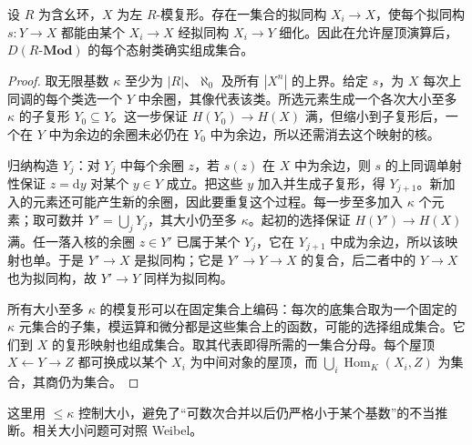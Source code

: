 \begin{proposition}\label{b4:prop:module-derived-size}
	设 \(R\) 为含幺环，\(X\) 为左 \(R\)-模复形。存在一集合的拟同构 \(X_i\to X\)，使每个拟同构 \(s:Y\to X\) 都能由某个 \(X_i\to X\) 经拟同构 \(X_i\to Y\) 细化。因此在允许屋顶演算后，\(D(R\text{-}\mathbf{Mod})\) 的每个态射类确实组成集合。
\end{proposition}
\begin{proof}
	取无限基数 \(\kappa\) 至少为 \(|R|\)、\(\aleph_0\) 及所有 \(|X^n|\) 的上界。给定 \(s\)，为 \(X\) 每次上同调的每个类选一个 \(Y\) 中余圈，其像代表该类。所选元素生成一个各次大小至多 \(\kappa\) 的子复形 \(Y_0\subseteq Y\)。这一步保证 \(H(Y_0)\to H(X)\) 满，但缩小到子复形后，一个在 \(Y\) 中为余边的余圈未必仍在 \(Y_0\) 中为余边，所以还需消去这个映射的核。

	归纳构造 \(Y_j\)：对 \(Y_j\) 中每个余圈 \(z\)，若 \(s(z)\) 在 \(X\) 中为余边，则 \(s\) 的上同调单射性保证 \(z=\mathrm{d}y\) 对某个 \(y\in Y\) 成立。把这些 \(y\) 加入并生成子复形，得 \(Y_{j+1}\)。新加入的元素还可能产生新的余圈，因此要重复这个过程。每一步至多加入 \(\kappa\) 个元素；取可数并 \(Y'=\bigcup_jY_j\)，其大小仍至多 \(\kappa\)。起初的选择保证 \(H(Y')\to H(X)\) 满。任一落入核的余圈 \(z\in Y'\) 已属于某个 \(Y_j\)，它在 \(Y_{j+1}\) 中成为余边，所以该映射也单。于是 \(Y'\to X\) 是拟同构；它是 \(Y'\to Y\to X\) 的复合，后二者中的 \(Y\to X\) 也为拟同构，故 \(Y'\to Y\) 同样为拟同构。

	所有大小至多 \(\kappa\) 的模复形可以在固定集合上编码：每次的底集合取为一个固定的 \(\kappa\) 元集合的子集，模运算和微分都是这些集合上的函数，可能的选择组成集合。它们到 \(X\) 的复形映射也组成集合。取其代表即得所需的一集合分母。每个屋顶 \(X\leftarrow Y\to Z\) 都可换成以某个 \(X_i\) 为中间对象的屋顶，而 \(\bigcup_i\operatorname{Hom}_{K}(X_i,Z)\) 为集合，其商仍为集合。
\end{proof}

这里用 \(\le\kappa\) 控制大小，避免了“可数次合并以后仍严格小于某个基数”的不当推断。相关大小问题可对照 Weibel\cite[Set-Theoretic Considerations 10.3.6; Proposition 10.4.4]{Weibel1994HomologicalAlgebra}。

